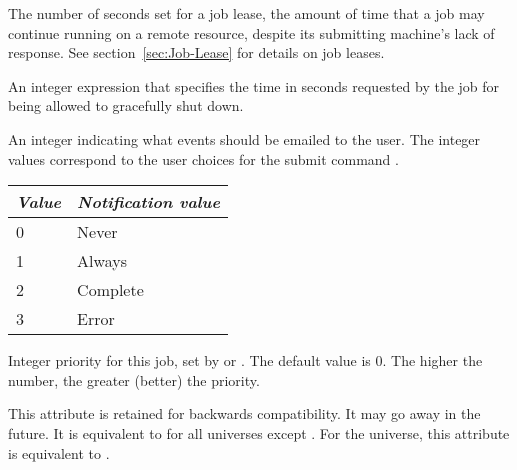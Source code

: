 \begin{description}
\item[\AdAttr{JobLeaseDuration}:]  The number of seconds set for
a job lease, the amount of time that a job may continue running
on a remote resource,
despite its submitting machine's lack of response.
See section~\ref{sec:Job-Lease} for details on job leases.

\item[\AdAttr{JobMaxVacateTime}:] An integer expression that specifies
the time in seconds requested by the job for being allowed to
gracefully shut down.

\item[\AdAttr{JobNotification}:] An integer indicating what events should
be emailed to the user. The integer values correspond to the user 
choices for the submit command .
\begin{center}
\begin{table}[hbt]
\begin{tabular}{|p{2cm}p{10cm}|} \hline
\emph{Value} & \emph{Notification value} \\ \hline \hline
0 & Never \\ \hline
1 & Always \\ \hline
2 & Complete \\ \hline
3 & Error \\ \hline
\end{tabular}
\end{table}
\end{center}

\item[\AdAttr{JobPrio}:]  Integer priority for this job, set by
 or .  The default value is 0.  The higher
the number, the greater (better) the priority.

\item[\AdAttr{JobRunCount}:]  This attribute is retained for backwards
  compatibility.  It may go away in the future.  It is equivalent to
   for all universes except .
  For the  universe, this attribute is equivalent to
  .


\end{description}
